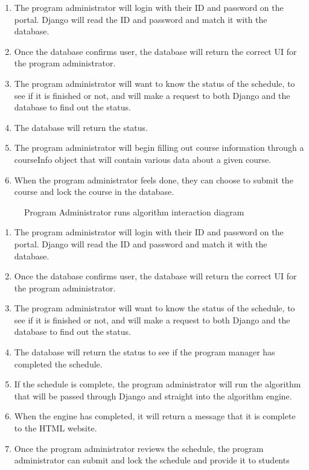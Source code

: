 \documentclass[12pt,article]{memoir}
\begin{document}
\begin{enumerate}
\item The program administrator will login with their ID and password on the portal. Django will read the ID and password and match it with the database. 
\item Once the database confirms user, the database will return the correct UI for the program administrator.
\item The program administrator will want to know the status of the schedule, to see if it is finished or not, and will make a request to both Django and the database to find out the status. 
\item The database will return the status. 
\item The program administrator will begin filling out course information through a courseInfo object that will contain various data about a given course.
\item When the program administrator feels done, they can choose to submit the course and lock the course in the database. 
\end{enumerate}

\begin{figure}[htb]
\caption{Program Administrator runs algorithm interaction diagram}
\end{figure}

\begin{enumerate}
\item The program administrator will login with their ID and password on the portal. Django will read the ID and password and match it with the database. 
\item Once the database confirms user, the database will return the correct UI for the program administrator.
\item The program administrator will want to know the status of the schedule, to see if it is finished or not, and will make a request to both Django and the database to find out the status. 
\item The database will return the status to see if the program manager has completed the schedule. 
\item If the schedule is complete, the program administrator will run the algorithm that will be passed through Django and straight into the algorithm engine.
\item When the engine has completed, it will return a message that it is complete to the HTML website. 
\item Once the program administrator reviews the schedule, the program administrator can submit and lock the schedule and provide it to students
\end{enumerate}
\end{document}

